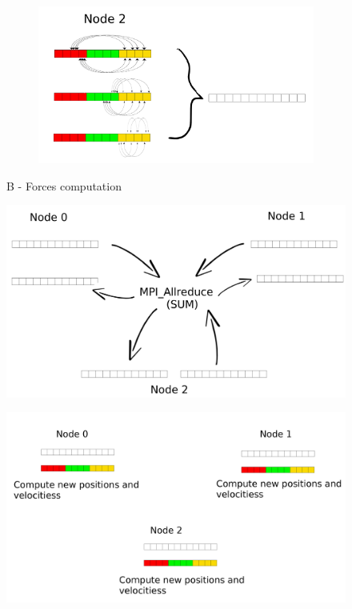 \documentclass[a4paper]{article}
\begin{document}
\begin{figure}[ht]
\begin{subfigure}{.5\textwidth}
\end{subfigure} \\ %
\begin{subfigure}{\textwidth}
  \centering
  \includegraphics[width=0.5\linewidth]{force_calculation_2}
\end{subfigure}
  \caption{B - Forces computation}
  \label{fig:B2}
\end{figure}
\FloatBarrier

\begin{figure}
\centering
\begin{minipage}{.5\textwidth}
  \centering
  \includegraphics[width=1\linewidth]{MPI_all_reduce}
  \label{fig:C2}
\end{minipage}%
\begin{minipage}{.5\textwidth}
  \centering
  \includegraphics[width=1\linewidth]{compute_positions}
  \label{fig:D2}
\end{minipage}
\end{figure}
\FloatBarrier
\end{document}
